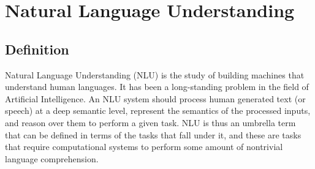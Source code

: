 \section{Natural Language Understanding}
\subsection{Definition}
Natural Language Understanding (NLU) is the study of building machines that understand human languages.
It has been a long-standing
problem in the field of Artificial Intelligence. An NLU system should process human generated text
(or speech) at a deep semantic level, represent the semantics of the processed inputs, and reason
over them to perform a given task. NLU is thus an umbrella term that can be defined in terms of the
tasks that fall under it, and these are tasks that require computational systems to perform some
amount of nontrivial language comprehension.


